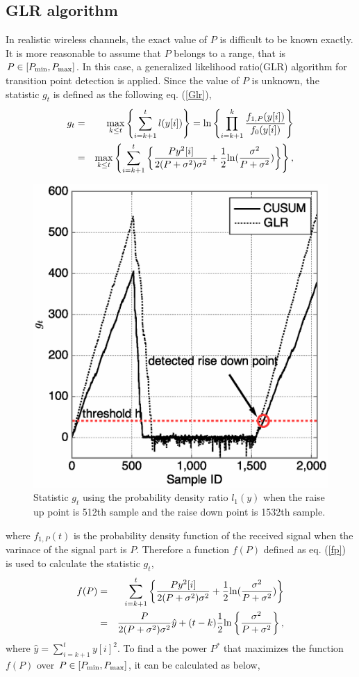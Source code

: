 \subsection{GLR algorithm}
In realistic wireless channels, the exact value of $P$ is difficult to be known exactly. It is more reasonable to assume that $P$ belongs to a range, that is $P\in[P_{{\rm min}}, P_{\rm {max}}]$. In this case, a generalized likelihood ratio(GLR) algorithm\cite{ref:GLR} for transition point detection is applied. Since the value of $P$ is unknown, the statistic $g_t$ is defined as the following eq. (\ref{Glr}),
\begin{eqnarray}
g_t &=& \max_{k \leq t}\left\{ \sum_{i=k+1}^tl(y[i])\right\}={\rm ln}\left\{\prod_{i=k+1}^k\frac{f_{1,P}(y[i])}{f_0(y[i])}\right\} \nonumber \\ 
   &=& \max_{k \leq t}\left\{\sum_{i=k+1}^t\left\{ \frac{Py^2[i]}{2(P+\sigma^2)\sigma^2}+\frac{1}{2} {\rm ln}(\frac{\sigma^2}{P+\sigma^2}) \right\}\right\},
\label{Glr}
\end{eqnarray}
\begin{figure}[t]
\centering
\includegraphics[width=120mm]{ON2OFF.eps}
\caption{Statistic $g_t$ using the probability density ratio $l_1(y)$ when the raise up point is 512th sample and the raise down point is 1532th sample.}
\label{ON2OFF}
\end{figure}
where $f_{1,P}(t)$ is the probability density function of the received signal when the varinace of the signal part is $P$. Therefore a function $f(P)$ defined as eq. (\ref{fp}) is used to calculate the statistic $g_t$,
\begin{eqnarray}
f(P) &=& \sum_{i=k+1}^t\left\{ \frac{Py^2[i]}{2(P+\sigma^2)\sigma^2}+\frac{1}{2} {\rm ln}(\frac{\sigma^2}{P+\sigma^2})\right\} \nonumber\\ 
&=&\frac{P}{2(P+\sigma^2)\sigma^2}\hat{y}+(t-k)\frac{1}{2}{\rm ln}\left\{ \frac{\sigma^2}{P+\sigma^2} \right\},
\label{fp}
\end{eqnarray}
where $\hat{y}=\sum_{i=k+1}^t y[i]^2$. To find a the power $P^{*}$ that maximizes the function $f(P)$ over $P \in [P_{{\rm min}}, P_{{\rm max}}]$, it can be calculated as below,

